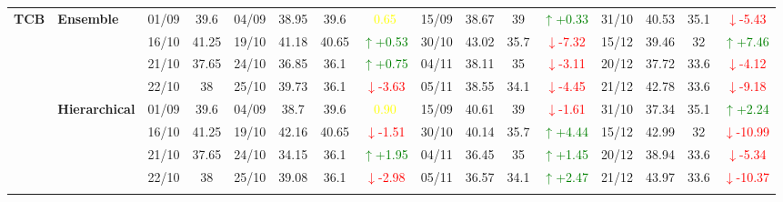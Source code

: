 \documentclass{ieeeaccess}
\begin{document}
{\begin{longtable}{llcc|cccc|cccc|cccc}
\multirow{12}{*}{\textbf{TCB}} 
& \textbf{Ensemble}
& 01/09 & 39.6 & 04/09 & 38.95 & 39.6 & \textcolor{yellow}{0.65} & 15/09 & 38.67 & 39 & \textcolor{green}{\(\uparrow\)+0.33} & 31/10 & 40.53 & 35.1 & \textcolor{red}{\(\downarrow\)-5.43} \\

&
& 16/10 & 41.25 & 19/10 & 41.18 & 40.65 & \textcolor{green}{\(\uparrow\)+0.53} & 30/10 & 43.02 & 35.7 & \textcolor{red}{\(\downarrow\)-7.32} & 15/12 & 39.46 & 32 & \textcolor{green}{\(\uparrow\)+7.46} \\

&
& 21/10 & 37.65 & 24/10 & 36.85 & 36.1 & \textcolor{green}{\(\uparrow\)+0.75} & 04/11 & 38.11 & 35 & \textcolor{red}{\(\downarrow\)-3.11} & 20/12 & 37.72 & 33.6 & \textcolor{red}{\(\downarrow\)-4.12} \\

&
& 22/10 & 38 & 25/10 & 39.73 & 36.1 & \textcolor{red}{\(\downarrow\)-3.63} & 05/11 & 38.55 & 34.1 & \textcolor{red}{\(\downarrow\)-4.45} & 21/12 & 42.78 & 33.6 & \textcolor{red}{\(\downarrow\)-9.18} \\
\cmidrule(lr){2-16}


& \textbf{Hierarchical}
& 01/09 & 39.6 & 04/09 & 38.7 & 39.6 & \textcolor{yellow}{0.90} & 15/09 & 40.61 & 39 & \textcolor{red}{\(\downarrow\)-1.61} & 31/10 & 37.34 & 35.1 & \textcolor{green}{\(\uparrow\)+2.24} \\

&
& 16/10 & 41.25 & 19/10 & 42.16 & 40.65 & \textcolor{red}{\(\downarrow\)-1.51} & 30/10 & 40.14 & 35.7 & \textcolor{green}{\(\uparrow\)+4.44} & 15/12 & 42.99 & 32 & \textcolor{red}{\(\downarrow\)-10.99} \\

&
& 21/10 & 37.65 & 24/10 & 34.15 & 36.1 & \textcolor{green}{\(\uparrow\)+1.95} & 04/11 & 36.45 & 35 & \textcolor{green}{\(\uparrow\)+1.45} & 20/12 & 38.94 & 33.6 & \textcolor{red}{\(\downarrow\)-5.34} \\

&
& 22/10 & 38 & 25/10 & 39.08 & 36.1 & \textcolor{red}{\(\downarrow\)-2.98} & 05/11 & 36.57 & 34.1 & \textcolor{green}{\(\uparrow\)+2.47} & 21/12 & 43.97 & 33.6 & \textcolor{red}{\(\downarrow\)-10.37} \\
\cmidrule(lr){2-16}




\end{longtable}}
\end{document}
